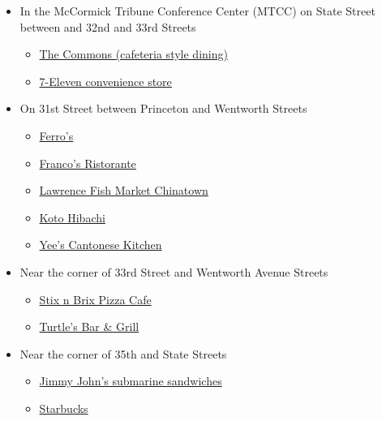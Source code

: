 \begin{itemize}
	\item In the McCormick Tribune Conference Center (MTCC) on State Street between and 32nd and 33rd Streets
	\begin{itemize}
		\item \href{https://dineoncampus.com/iit/hours-of-operation}{The Commons (cafeteria style dining)}
		\item \href{https://www.yelp.com/biz/7-eleven-chicago-12}{7-Eleven convenience store}
	\end{itemize}
	\item On 31st Street between Princeton and Wentworth Streets
	\begin{itemize}
		\item \href{https://www.yelp.com/biz/ferros-chicago}{Ferro's}
		\item \href{https://www.francoschicago.com/}{Franco's Ristorante}
		\item \href{https://ct.lawrencefish.com/}{Lawrence Fish Market Chinatown}
		\item \href{https://kotohibachichicago.com/}{Koto Hibachi}
		\item \href{https://www.yelp.com/biz/yees-cantonese-kitchen-chicago-2}{Yee's Cantonese Kitchen}
	\end{itemize}
		\item Near the corner of 33rd Street and Wentworth Avenue Streets
	\begin{itemize}
		\item \href{https://stixnbrix33.com/}{Stix n Brix Pizza Cafe}
		\item \href{https://www.yelp.com/biz/turtles-bar-and-grill-chicago}{Turtle's Bar \& Grill}
	\end{itemize}

	\item Near the corner of 35th and State Streets
	\begin{itemize}
		\item \href{https://www.yelp.com/biz/jimmy-johns-chicago-22}{Jimmy John's submarine sandwiches}
		\item \href{https://www.yelp.com/biz/starbucks-chicago-113}{Starbucks}
	\end{itemize}


\end{itemize}





